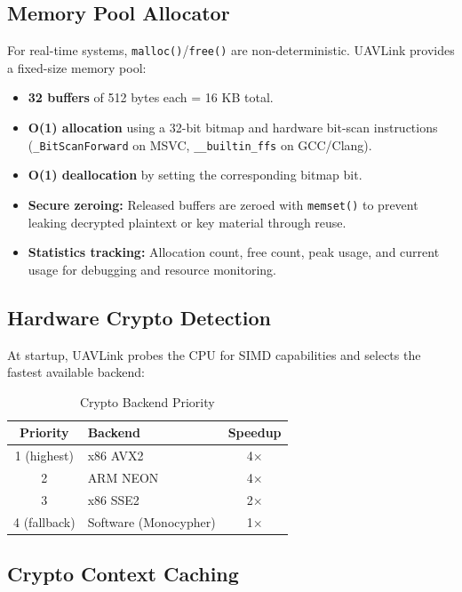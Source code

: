 \documentclass[11pt,a4paper]{article}
\begin{document}
\subsection{Memory Pool Allocator}

For real-time systems, \texttt{malloc()}/\texttt{free()} are non-deterministic. UAVLink provides a fixed-size memory pool:

\begin{itemize}[noitemsep]
    \item \textbf{32 buffers} of 512 bytes each = 16 KB total.
    \item \textbf{O(1) allocation} using a 32-bit bitmap and hardware bit-scan instructions (\texttt{\_BitScanForward} on MSVC, \texttt{\_\_builtin\_ffs} on GCC/Clang).
    \item \textbf{O(1) deallocation} by setting the corresponding bitmap bit.
    \item \textbf{Secure zeroing:} Released buffers are zeroed with \texttt{memset()} to prevent leaking decrypted plaintext or key material through reuse.
    \item \textbf{Statistics tracking:} Allocation count, free count, peak usage, and current usage for debugging and resource monitoring.
\end{itemize}

\subsection{Hardware Crypto Detection}

At startup, UAVLink probes the CPU for SIMD capabilities and selects the fastest available backend:

\begin{table}[H]
\centering
\caption{Crypto Backend Priority}
\begin{tabular}{@{}clc@{}}
\toprule
\textbf{Priority} & \textbf{Backend} & \textbf{Speedup} \\
\midrule
1 (highest) & x86 AVX2         & 4$\times$ \\
2           & ARM NEON         & 4$\times$ \\
3           & x86 SSE2         & 2$\times$ \\
4 (fallback)& Software (Monocypher) & 1$\times$ \\
\bottomrule
\end{tabular}
\end{table}

\subsection{Crypto Context Caching}
\end{document}
